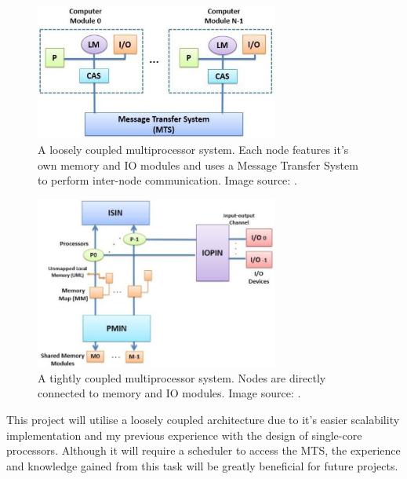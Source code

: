 \documentclass[11pt,a4paper]{report}
\begin{document}
{\begin{minipage}{0.45\textwidth}
\begin{figure}[H]
\centering
\includegraphics[width=8cm]{../img/loose}
\caption{A loosely coupled multiprocessor system. Each node features it's own memory and IO modules and uses a Message Transfer System to perform inter-node communication. Image source: \cite{preeti_aritra_2017}.}
\label{fig:loose}
\end{figure}
\end{minipage}
\begin{minipage}{0.05\textwidth}\hfill\end{minipage}
\begin{minipage}{0.45\textwidth}
\begin{figure}[H]
\centering
\includegraphics[width=8cm]{../img/tight}
\caption{A tightly coupled multiprocessor system. Nodes are directly connected to memory and IO modules. Image source: \cite{preeti_aritra_2017}.}
\label{fig:tight}
\end{figure}
\end{minipage}
\vspace{0.3cm}

This project will utilise a loosely coupled architecture due to it's easier scalability implementation and my previous experience with the design of single-core processors. Although it will require a scheduler to access the MTS, the experience and knowledge gained from this task will be greatly beneficial for future projects.

}
\end{document}
